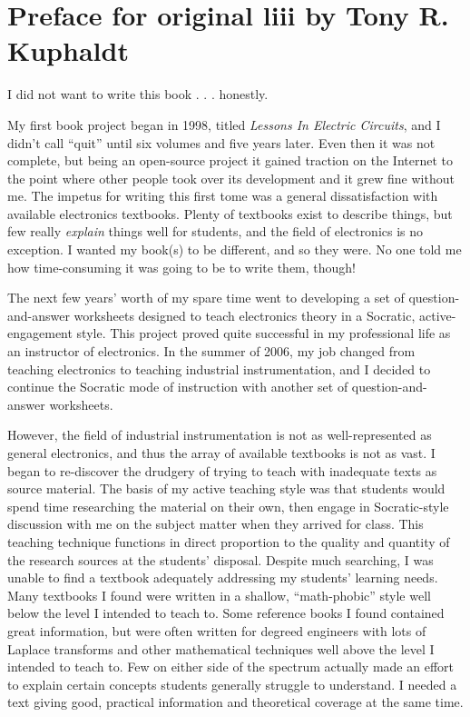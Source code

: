 \chapter*{Preface for original liii by Tony R. Kuphaldt}

I did not want to write this book . . . honestly.  

\vskip 10pt

\noindent
My first book project began in 1998, titled \textit{Lessons In Electric Circuits}, and I didn't call ``quit'' until six volumes and five years later.  Even then it was not complete, but being an open-source project it gained traction on the Internet to the point where other people took over its development and it grew fine without me.  The impetus for writing this first tome was a general dissatisfaction with available electronics textbooks.  Plenty of textbooks exist to describe things, but few really \textit{explain} things well for students, and the field of electronics is no exception.  I wanted my book(s) to be different, and so they were.  No one told me how time-consuming it was going to be to write them, though!

The next few years' worth of my spare time went to developing a set of question-and-answer worksheets designed to teach electronics theory in a Socratic, active-engagement style.  This project proved quite successful in my professional life as an instructor of electronics.  In the summer of 2006, my job changed from teaching electronics to teaching industrial instrumentation, and I decided to continue the Socratic mode of instruction with another set of question-and-answer worksheets.

However, the field of industrial instrumentation is not as well-represented as general electronics, and thus the array of available textbooks is not as vast.  I began to re-discover the drudgery of trying to teach with inadequate texts as source material.  The basis of my active teaching style was that students would spend time researching the material on their own, then engage in Socratic-style discussion with me on the subject matter when they arrived for class.  This teaching technique functions in direct proportion to the quality and quantity of the research sources at the students' disposal.  Despite much searching, I was unable to find a textbook adequately addressing my students' learning needs.  Many textbooks I found were written in a shallow, ``math-phobic'' style well below the level I intended to teach to.  Some reference books I found contained great information, but were often written for degreed engineers with lots of Laplace transforms and other mathematical techniques well above the level I intended to teach to.  Few on either side of the spectrum actually made an effort to explain certain concepts students generally struggle to understand.  I needed a text giving good, practical information and theoretical coverage at the same time.

